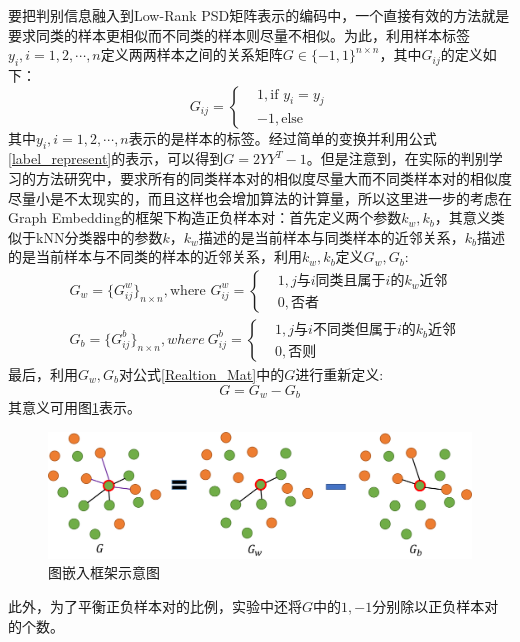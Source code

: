 要把判别信息融入到Low-Rank PSD矩阵表示的编码中，一个直接有效的方法就是要求同类的样本更相似而不同类的样本则尽量不相似。为此，利用样本标签$y_{i},i=1,2,\cdots,n$定义两两样本之间的关系矩阵$G\in\{-1,1\}^{n\times n}$，其中$G_{ij}$的定义如下：
\begin{equation}
\label{Realtion_Mat}
G_{ij}=\left\{
\begin{split}
&1,\text{if }y_i=y_j\\
&-1,\text{else}
\end{split}
\right.
\end{equation}
其中$y_i,i=1,2,\cdots,n$表示的是样本的标签。经过简单的变换并利用公式\ref{label_represent}的表示，可以得到$G=2YY^{T}-1$。但是注意到，在实际的判别学习的方法研究中，要求所有的同类样本对的相似度尽量大而不同类样本对的相似度尽量小是不太现实的，而且这样也会增加算法的计算量，所以这里进一步的考虑在Graph Embedding\cite{Graph_Embeding}的框架下构造正负样本对：首先定义两个参数$k_w,k_b$，其意义类似于kNN分类器中的参数$k$，$k_w$描述的是当前样本与同类样本的近邻关系，$k_b$描述的是当前样本与不同类的样本的近邻关系，利用$k_w,k_b$定义$G_w,G_b$:
\begin{equation}
\label{GE_Gw_Gb}
\begin{split}
&G_w=\{G^{w}_{ij}\}_{n \times n},\text{where }G^{w}_{ij}=\left\{
\begin{split}
&1,\text{$j$与$i$同类且属于$i$的$k_w$近邻}\\
&0,\text{否者}
\end{split}
\right.\\
&G_b=\{G^{b}_{ij}\}_{n \times n},where~G^{b}_{ij}=\left\{
\begin{split}
&1,\text{$j$与$i$不同类但属于$i$的$k_b$近邻}\\
&0,\text{否则}
\end{split}
\right.
\end{split}
\end{equation}
最后，利用$G_w,G_b$对公式\ref{Realtion_Mat}中的$G$进行重新定义:
\begin{equation}
\label{Graph_Mat}
G=G_w-G_b
\end{equation}
其意义可用图\ref{fig:Graph_Embedding}表示。
\begin{figure}[hbt]
	\centering
	\includegraphics[width=\linewidth]{source/Graph_Embedding.png}
	\caption{图嵌入框架示意图}
	\label{fig:Graph_Embedding}
\end{figure}
此外，为了平衡正负样本对的比例，实验中还将$G$中的$1,-1$分别除以正负样本对的个数。

